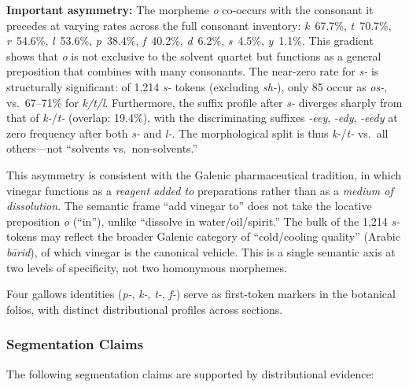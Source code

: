 \documentclass[11pt,a4paper]{article}
\begin{document}
\textbf{Important asymmetry:} The morpheme \textit{o} co-occurs with the consonant it precedes at varying rates across the full consonant inventory: \textit{k}~67.7\%, \textit{t}~70.7\%, \textit{r}~54.6\%, \textit{l}~53.6\%, \textit{p}~38.4\%, \textit{f}~40.2\%, \textit{d}~6.2\%, \textit{s}~4.5\%, \textit{y}~1.1\%. This gradient shows that \textit{o} is not exclusive to the solvent quartet but functions as a general preposition that combines with many consonants. The near-zero rate for \textit{s-} is structurally significant: of 1,214 \textit{s-} tokens (excluding \textit{sh-}), only 85 occur as \textit{os-}, vs.\ 67--71\% for \textit{k/t/l}. Furthermore, the suffix profile after \textit{s-} diverges sharply from that of \textit{k-}/\textit{t-} (overlap: 19.4\%), with the discriminating suffixes \textit{-eey}, \textit{-edy}, \textit{-eedy} at zero frequency after both \textit{s-} and \textit{l-}. The morphological split is thus \textit{k-}/\textit{t-} vs.\ all others---not ``solvents vs.\ non-solvents.''

This asymmetry is consistent with the Galenic pharmaceutical tradition, in which vinegar functions as a \textit{reagent added to} preparations rather than as a \textit{medium of dissolution}. The semantic frame ``add vinegar to'' does not take the locative preposition \textit{o} (``in''), unlike ``dissolve in water/oil/spirit.'' The bulk of the 1,214 \textit{s-} tokens may reflect the broader Galenic category of ``cold/cooling quality'' (Arabic \textit{b\=arid}), of which vinegar is the canonical vehicle. This is a single semantic axis at two levels of specificity, not two homonymous morphemes.

Four gallows identities (\textit{p-}, \textit{k-}, \textit{t-}, \textit{f-}) serve as first-token markers in the botanical folios, with distinct distributional profiles across sections.

\subsubsection{Segmentation Claims}

The following segmentation claims are supported by distributional evidence:
\end{document}
